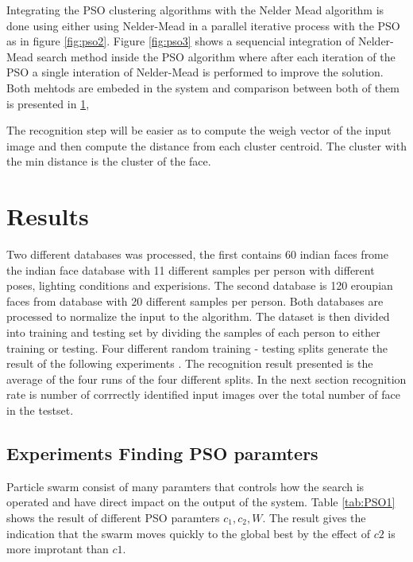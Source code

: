\documentclass[a4paper,twoside]{article}
\begin{document}
Integrating the PSO clustering algorithms with the Nelder Mead algorithm is done using either using Nelder-Mead in a parallel iterative process with the PSO as in figure \ref{fig:pso2}. Figure \ref{fig:pso3} shows a sequencial integration of Nelder-Mead search method inside the PSO algorithm where after each iteration of the PSO a single interation of Nelder-Mead is performed to improve the solution. Both mehtods are embeded in the system and comparison  between both of them is presented in \ref{sec:Results}, %


The recognition step will be easier as to compute the weigh vector of the input image and then compute the distance from each cluster centroid. The cluster with the min distance is the cluster of the face.

\section{Results}
\label{sec:Results}
Two different databases  was processed, the first contains 60 indian faces frome the indian face database \cite{JainMukherjeeIndianFaceDB} with 11 different samples per person  with different poses, lighting conditions and experisions. The second database is 120 eroupian faces from database \cite{} with 20 different samples per person. Both databases are processed to normalize the input to the algorithm. The dataset is then divided into training and testing set by dividing the samples of each person to either training or testing.  Four different  random training - testing splits generate the result of the following experiments . The recognition result presented is the average of the four runs of the four different splits. In the next section recognition rate is number of corrrectly identified input images over the total number of face in the testset.


\subsection{Experiments Finding PSO paramters}
\label{sec:pso}

Particle swarm consist of many paramters that controls how the search is operated and have direct impact on the output of the system. Table \ref{tab:PSO1} shows the result of different PSO paramters $c_1,c_2,W$. The result gives the indication that the swarm moves quickly to the global best by the effect of $c2$ is more improtant than $c1$.
\end{document}

